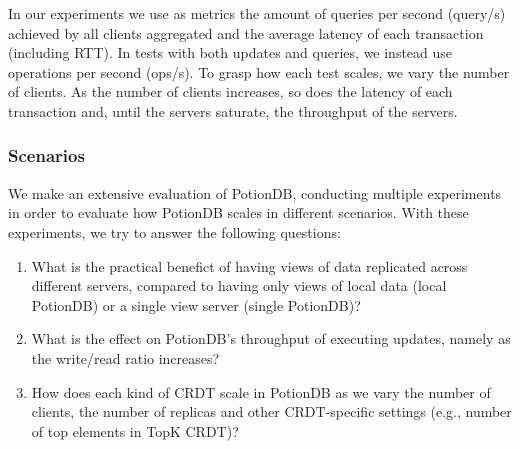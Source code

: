 \documentclass[sigplan,10pt]{acmart}
\newcommand{\andre}[1]{\nbnote{Andre}{blue}{#1}}
\begin{document}
In our experiments we use as metrics the amount of queries per second (query/s) achieved by all clients aggregated and the average latency of each transaction (including RTT).
In tests with both updates and queries, we instead use operations per second (ops/s).
To grasp how each test scales, we vary the number of clients.
As the number of clients increases, so does the latency of each transaction and, until the servers saturate, the throughput of the servers.

\subsubsection{Scenarios}

We make an extensive evaluation of PotionDB, conducting multiple experiments in order to evaluate how PotionDB scales in different scenarios. %
With these experiments, we try to answer the following questions:

\begin{enumerate}
	\item \label{enum:question1} What is the practical benefict of having views of data replicated across different servers, compared to having only views of local data (local PotionDB) or a single view server (single PotionDB)?
	\item \label{enum:question2}What is the effect on PotionDB's throughput of executing updates, namely as the write/read ratio increases?
	\item\label{enum:question4}How does each kind of CRDT scale in PotionDB as we vary the number of clients, the number of replicas and other CRDT-specific settings (e.g., number of top elements in TopK CRDT)?
\end{enumerate}
\end{document}
